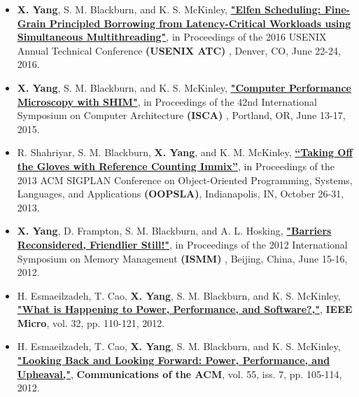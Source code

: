 \documentclass[letterpaper,11pt]{article}
\begin{document}
\begin{itemize}

\item {\bf X. Yang}, S. M. Blackburn, and K. S. McKinley, \href{https://github.com/yangxi/papers/raw/master/elfen-atc-2016.pdf} {\color{blue} \bf
    "Elfen Scheduling: Fine-Grain Principled Borrowing from Latency-Critical
    Workloads using Simultaneous Multithreading"}, in Proceedings of the 2016
  USENIX Annual Technical Conference {\bf (USENIX ATC) }, Denver, CO, June 22-24, 2016.

\item {\bf X. Yang}, S. M. Blackburn, and K. S. McKinley, \href{https://github.com/yangxi/papers/raw/master/shim-isca-2015.pdf} {\color{blue} \bf
    "Computer Performance Microscopy with SHIM"}, in Proceedings of the 42nd International 
     Symposium on Computer Architecture {\bf (ISCA) }, Portland,
     OR, June 13-17, 2015.

\item R. Shahriyar, S. M. Blackburn, {\bf X. Yang}, and K. M. McKinley,
  \href{https://github.com/yangxi/papers/raw/master/rcix-oopsla-2013.pdf}{\color{blue} \bf
      ``Taking Off the Gloves with Reference Counting Immix''}, in Proceedings of 
      the 2013 ACM SIGPLAN Conference on Object-Oriented Programming, Systems,
      Languages, and Applications {\bf (OOPSLA)}, Indianapolis, IN,
      October 26-31, 2013.

\item{\bf X. Yang}, D. Frampton, S. M. Blackburn, and A. L. Hosking,
  \href{https://github.com/yangxi/papers/raw/master/barrier-ismm-2012.pdf}{\color{blue} \bf
    "Barriers Reconsidered, Friendlier Still!"}, in Proceedings of the 2012
  International Symposium on Memory Management {\bf (ISMM) }, Beijing,
  China, June 15-16, 2012.

\item H. Esmaeilzadeh, T. Cao, {\bf X. Yang}, S. M. Blackburn, and
    K. S. McKinley,
    \href{https://github.com/yangxi/papers/raw/master/powerperf-micro-2012.pdf}{\color{blue}
      \bf "What is Happening to Power, Performance, and
      Software?,"}, {\bf IEEE Micro}, vol. 32, pp. 110-121, 2012. 

\item H. Esmaeilzadeh, T. Cao, {\bf X. Yang}, S. M. Blackburn, and
    K. S. McKinley, \href{https://github.com/yangxi/papers/raw/master/powerperf-cacm-2012.pdf}{\color{blue}\bf "Looking Back and Looking Forward: Power, Performance,
      and Upheaval,"}, {\bf Communications of the ACM}, vol. 55, iss. 7, pp. 105-114, 2012.


\end{itemize}
\end{document}
